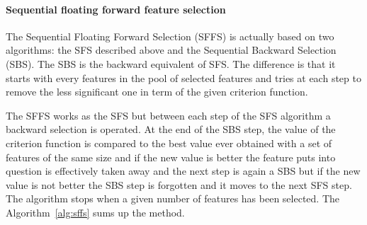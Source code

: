 \documentclass[a4paper,11pt,DIV=16,abstracton]{scrartcl}
\begin{document}
            \begin{table}[!ht]
                \caption{Criterion functions values corresponding to Figure~\ref{fig:expl_dataset} dataset (50\% for training/50\% for testing).\label{tab:expl_metric}}
            \end{table}

            \paragraph{Sequential floating forward feature selection}
            \label{sec:floating-presentation}

            The Sequential Floating Forward Selection (SFFS) is actually based on two algorithms: the SFS described above and the Sequential Backward Selection (SBS). The SBS is the backward equivalent of SFS. The difference is that it starts with every features in the pool of selected features and tries at each step to remove the less significant one in term of the given criterion function.

            The SFFS works as the SFS but between each step of the SFS algorithm a backward selection is operated. At the end of the SBS step, the value of the criterion function is compared to the best value ever obtained with a set of features of the same size and if the new value is better the feature puts into question is effectively taken away and the next step is again a SBS but if the new value is not better the SBS step is forgotten and it moves to the next SFS step. The algorithm stops when a given number of features has been selected. The Algorithm~\ref{alg:sffs} sums up the method.
\end{document}
